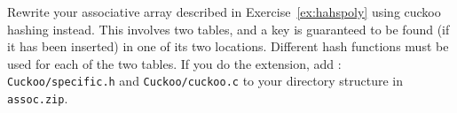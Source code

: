 
\begin{exercise}
Rewrite your associative array described in Exercise~\ref{ex:hahspoly}
using cuckoo hashing instead.
This involves two tables, and a key is guaranteed to be found (if it
has been inserted) in one of its two locations. Different hash functions
must be used for each of the two tables.
If you do the extension, add :\\
\verb^Cuckoo/specific.h^ and \verb^Cuckoo/cuckoo.c^
to your directory structure in \verb^assoc.zip^.
\end{exercise}
